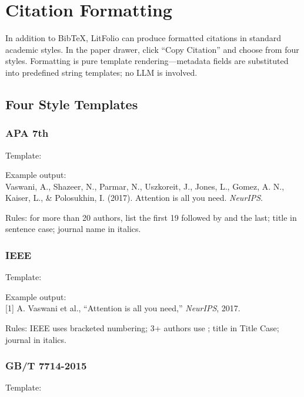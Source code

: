 \section{Citation Formatting}

In addition to BibTeX, LitFolio can produce formatted citations in standard academic
styles. In the paper drawer, click ``Copy Citation'' and choose from four styles.
Formatting is pure template rendering---metadata fields are substituted into predefined
string templates; no LLM is involved.

\subsection{Four Style Templates}

\subsubsection{APA 7th}

Template:

Example output:\\
Vaswani, A., Shazeer, N., Parmar, N., Uszkoreit, J., Jones, L., Gomez, A. N.,
Kaiser, L., \& Polosukhin, I. (2017). Attention is all you need. \textit{NeurIPS}.

Rules: for more than 20 authors, list the first 19 followed by  and the last;
title in sentence case; journal name in italics.

\subsubsection{IEEE}

Template:

Example output:\\
{[}1{]} A. Vaswani et al., ``Attention is all you need,'' \textit{NeurIPS}, 2017.

Rules: IEEE uses bracketed numbering; 3+ authors use ; title in Title Case;
journal in italics.

\subsubsection{GB/T 7714-2015}

Template:

